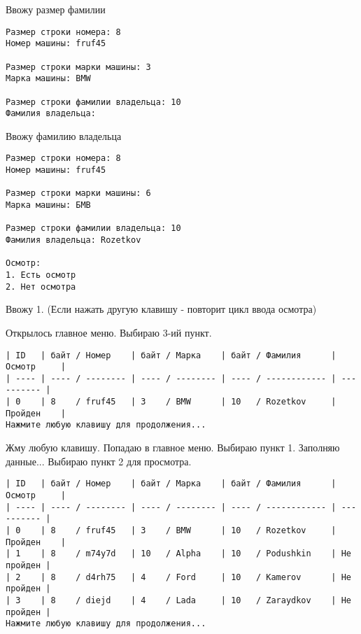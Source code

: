 Ввожу размер фамилии

\begin{tcolorbox}
\begin{verbatim}
Размер строки номера: 8
Номер машины: fruf45

Размер строки марки машины: 3
Марка машины: BMW

Размер строки фамилии владельца: 10
Фамилия владельца:
\end{verbatim}
\end{tcolorbox}

Ввожу фамилию владельца

\begin{tcolorbox}
\begin{verbatim}
Размер строки номера: 8
Номер машины: fruf45

Размер строки марки машины: 6
Марка машины: БМВ

Размер строки фамилии владельца: 10
Фамилия владельца: Rozetkov

Осмотр:       
1. Есть осмотр
2. Нет осмотра
\end{verbatim}
\end{tcolorbox}

Ввожу 1. (Если нажать другую клавишу - повторит цикл ввода осмотра)

Открылось главное меню. Выбираю 3-ий пункт.

\begin{tcolorbox}
\begin{verbatim}
| ID   | байт / Номер    | байт / Марка    | байт / Фамилия      | Осмотр     |
| ---- | ---- / -------- | ---- / -------- | ---- / ------------ | ---------- |
| 0    | 8    / fruf45   | 3    / BMW      | 10   / Rozetkov     | Пройден    |
Нажмите любую клавишу для продолжения...
\end{verbatim}
\end{tcolorbox}

Жму любую клавишу. Попадаю в главное меню. Выбираю пункт 1. Заполняю данные... Выбираю пункт 2 для просмотра.

\begin{tcolorbox}
\begin{verbatim}
| ID   | байт / Номер    | байт / Марка    | байт / Фамилия      | Осмотр     |
| ---- | ---- / -------- | ---- / -------- | ---- / ------------ | ---------- |
| 0    | 8    / fruf45   | 3    / BMW      | 10   / Rozetkov     | Пройден    |
| 1    | 8    / m74y7d   | 10   / Alpha    | 10   / Podushkin    | Не пройден |
| 2    | 8    / d4rh75   | 4    / Ford     | 10   / Kamerov      | Не пройден |
| 3    | 8    / diejd    | 4    / Lada     | 10   / Zaraydkov    | Не пройден |
Нажмите любую клавишу для продолжения...
\end{verbatim}
\end{tcolorbox}

